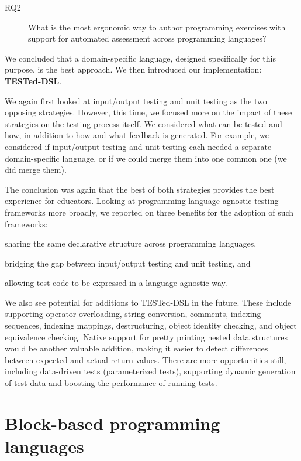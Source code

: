 \documentclass[main]{subfiles}
\begin{document}
\begin{description}
    \item[RQ2] What is the most ergonomic way to author programming exercises with support for automated assessment across programming languages?
\end{description}

We concluded that a domain-specific language, designed specifically for this purpose, is the best approach.
We then introduced our implementation: \textbf{TESTed-DSL}\@.

We again first looked at input/output testing and unit testing as the two opposing strategies.
However, this time, we focused more on the impact of these strategies on the testing process itself.
We considered what can be tested and how, in addition to how and what feedback is generated.
For example, we considered if input/output testing and unit testing each needed a separate domain-specific language, or if we could merge them into one common one (we did merge them).

The conclusion was again that the best of both strategies provides the best experience for educators.
Looking at programming-language-agnostic testing frameworks more broadly, we reported on three benefits for the adoption of such frameworks: \begin{enumerate*}[label=\emph{\roman*})] \item sharing the same declarative structure across programming languages, \item bridging the gap between input/output testing and unit testing, and \item allowing test code to be expressed in a language-agnostic way.\end{enumerate*}

We also see potential for additions to TESTed-DSL in the future.
These include supporting operator overloading, string conversion, comments, indexing sequences, indexing mappings, destructuring, object identity checking, and object equivalence checking.
Native support for pretty printing nested data structures would be another valuable addition, making it easier to detect differences between expected and actual return values.
There are more opportunities still, including data-driven tests (parameterized tests), supporting dynamic generation of test data and boosting the performance of running tests.

\section{Block-based programming languages}\label{sec:for-block-based-programming-languages}
\end{document}
